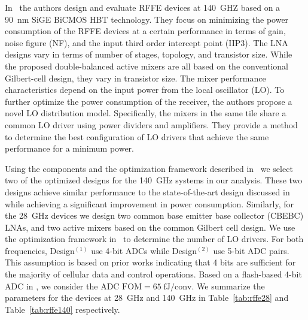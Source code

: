 In~\cite{skrimponis2021towards} the authors design and evaluate RFFE devices at \SI{140}{GHZ} based on a \SI{90}{nm} SiGE BiCMOS HBT technology. They focus on minimizing the power consumption of the RFFE devices at a certain performance in terms of gain, noise figure (NF), and the input third order intercept point (IIP3). The LNA designs vary in terms of number of stages, topology, and transistor size. While the proposed double-balanced active mixers are all based on the conventional Gilbert-cell design, they vary in transistor size. The mixer performance characteristics depend on the input power from the local oscillator (LO). To further optimize the power consumption of the receiver, the authors propose a novel LO distribution model. Specifically, the mixers in the same tile share a common LO driver using power dividers and amplifiers. They provide a method to determine the best configuration of LO drivers that achieve the same performance for a minimum power.

Using the components and the optimization framework described in~\cite{skrimponis2021towards} we select two of the optimized designs for the \SI{140}{GHz} systems in our analysis. These two designs achieve similar performance to the state-of-the-art design discussed in \cite{skrimponis2020power} while achieving a significant improvement in power consumption. Similarly, for the \SI{28}{GHz} devices we design two common base emitter base collector (CBEBC) LNAs, and two active mixers based on the common Gilbert cell design. We use the optimization framework in~\cite{skrimponis2021towards} to determine the number of LO drivers. For both frequencies, Design$^{(1)}$ use 4-bit ADCs while Design$^{(2)}$ use 5-bit ADC pairs. This assumption is based on prior works \cite{abbas2017millimeter,zhang2018low,abdelghany2018towards,dutta2019case} indicating that 4 bits are sufficient for the majority of cellular data and control operations. Based on a flash-based 4-bit ADC in \cite{Nasri2017}, we consider the ADC $\mathrm{FOM} = 65\;\mathrm{fJ/conv}$. We summarize the parameters for the devices at \SI{28}{GHz} and \SI{140}{GHz} in Table~\ref{tab:rffe28} and Table~\ref{tab:rffe140} respectively. 


